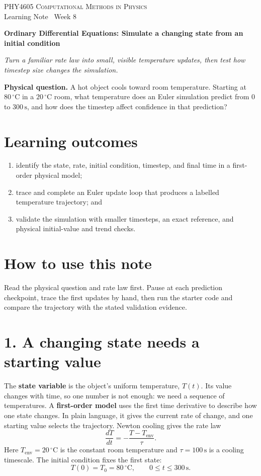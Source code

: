 \documentclass[11pt,a4paper]{article}
\newcommand{\course}{PHY4605 Computational Methods in Physics}
\newcommand{\units}[1]{\,\mathrm{#1}}
\begin{document}
{\large\textsc{\course}}\\[-2pt]
{\small Learning Note \textbar\ Week 8}\par\vspace{4pt}
{\LARGE\bfseries Ordinary Differential Equations: Simulate a changing state from an initial condition}\par\vspace{3pt}
\textit{Turn a familiar rate law into small, visible temperature updates, then test how timestep size changes the simulation.}

\begin{keybox}\textbf{Physical question.} A hot object cools toward room temperature. Starting at $80\units{^\circ C}$ in a $20\units{^\circ C}$ room, what temperature does an Euler simulation predict from $0$ to $300\units{s}$, and how does the timestep affect confidence in that prediction?\end{keybox}

\section*{Learning outcomes}
\begin{enumerate}[nosep,leftmargin=5mm]
\item identify the state, rate, initial condition, timestep, and final time in a first-order physical model;
\item trace and complete an Euler update loop that produces a labelled temperature trajectory; and
\item validate the simulation with smaller timesteps, an exact reference, and physical initial-value and trend checks.
\end{enumerate}

\section*{How to use this note}
Read the physical question and rate law first. Pause at each prediction checkpoint, trace the first updates by hand, then run the starter code and compare the trajectory with the stated validation evidence.

\section*{1. A changing state needs a starting value}
The \textbf{state variable} is the object's uniform temperature, $T(t)$. Its value changes with time, so one number is not enough: we need a sequence of temperatures. A \textbf{first-order model} uses the first time derivative to describe how one state changes. In plain language, it gives the current rate of change, and one starting value selects the trajectory. Newton cooling gives the rate law
\[
\frac{dT}{dt}=-\frac{T-T_{\mathrm{env}}}{\tau}.
\]
Here $T_{\mathrm{env}}=20\units{^\circ C}$ is the constant room temperature and $\tau=100\units{s}$ is a cooling timescale. The initial condition fixes the first state:
\[
T(0)=T_0=80\units{^\circ C}, \qquad 0\le t\le300\units{s}.
\]
\end{document}
